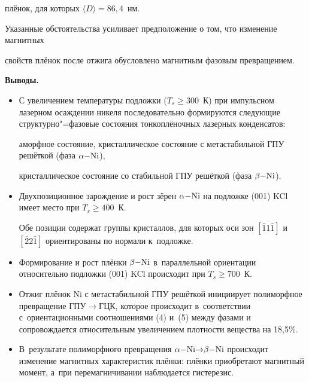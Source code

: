 плёнок, для которых $\langle D \rangle  = 86,4$~нм.

Указанные обстоятельства усиливает предположение о том, что изменение магнитных

свойств плёнок после отжига обусловлено магнитным фазовым превращением.



\textbf{Выводы.}

\begin{itemize}



\item[1.] С увеличением температуры подложки ($T_{s} \geqslant  300$~К) при импульсном лазерном осаждении никеля последовательно формируются следующие структурно"=фазовые состояния тонкоплёночных лазерных конденсатов:

аморфное состояние, кристаллическое состояние с метастабильной ГПУ решёткой (фаза $\alpha \rm{-}Ni$),

кристаллическое состояние со стабильной ГПУ решёткой (фаза $\beta \rm{-}Ni$).



\item[2.] Двухпозиционное зарождение и рост зёрен $\alpha \rm {-} Ni$ на подложке (001) KCl имеет место при $T_{s} \geqslant  400$~К.

Обе позиции содержат группы кристаллов, для которых оси зон $[\bar {1}1\bar {1}]$ и $[\bar {2}2\bar {1}]$ ориентированы по нормали к~подложке.



\item[3.] Формирование и рост плёнки $\beta \rm{-}Ni$ в~параллельной ориентации относительно подложки (001) KCl происходит при $T_{s} \geqslant  700$~К.



\item[4.] Отжиг плёнок Ni с метастабильной ГПУ решёткой инициирует полиморфное превращение ГПУ$\to $ГЦК, которое происходит в~соответствии с~ориентационными соотношениями (4) и~(5) между фазами и сопровождается относительным увеличением плотности вещества на 18,5{\%}.



\item[5.] В~результате полиморфного превращения $\alpha \rm{-}Ni{\to}\beta \rm{-}Ni$ происходит изменение магнитных характеристик плёнки: плёнки приобретают магнитный момент, а~при перемагничивании наблюдается гистерезис.

\end{itemize}



